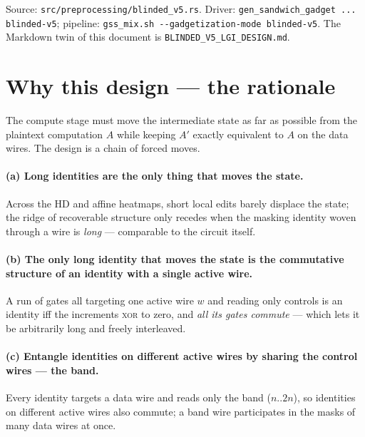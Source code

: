 \documentclass[11pt]{article}
\newcommand{\doc}[1]{\texttt{#1}}
\begin{document}
Source: \doc{src/preprocessing/blinded\_v5.rs}. Driver:
\doc{gen\_sandwich\_gadget ... blinded-v5}; pipeline:
\doc{gss\_mix.sh -{}-gadgetization-mode blinded-v5}. The Markdown twin of this
document is \doc{BLINDED\_V5\_LGI\_DESIGN.md}.

\section{Why this design --- the rationale}

The compute stage must move the intermediate state as far as possible from the
plaintext computation $A$ while keeping $A'$ exactly equivalent to $A$ on the data
wires. The design is a chain of forced moves.

\paragraph{(a) Long identities are the only thing that moves the state.} Across
the HD and affine heatmaps, short local edits barely displace the state; the ridge
of recoverable structure only recedes when the masking identity woven through a
wire is \emph{long} --- comparable to the circuit itself.

\paragraph{(b) The only long identity that moves the state is the commutative
structure of an identity with a single active wire.} A run of gates all targeting
one active wire $w$ and reading only controls is an identity iff the increments
\textsc{xor} to zero, and \emph{all its gates commute} --- which lets it be
arbitrarily long and freely interleaved.

\paragraph{(c) Entangle identities on different active wires by sharing the
control wires --- the band.} Every identity targets a data wire and reads only the
band ($n..2n$), so identities on different active wires also commute; a band wire
participates in the masks of many data wires at once.
\end{document}
